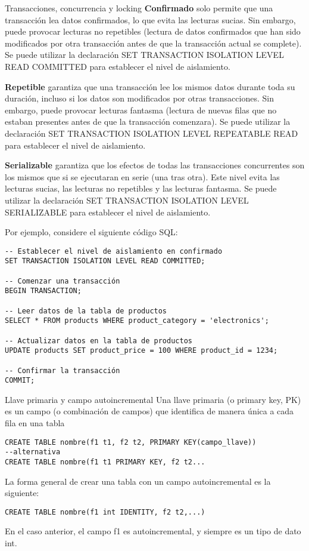 \begin{frame}[fragile]{Transacciones, concurrencia y locking}
\textbf{Confirmado} solo permite que una transacción lea datos
confirmados, lo que evita las lecturas sucias. Sin embargo, puede
provocar lecturas no repetibles (lectura de datos confirmados que han
sido modificados por otra transacción antes de que la transacción actual
se complete). Se puede utilizar la declaración SET TRANSACTION ISOLATION
LEVEL READ COMMITTED para establecer el nivel de aislamiento.

\textbf{Repetible} garantiza que una transacción lee los mismos datos
durante toda su duración, incluso si los datos son modificados por otras
transacciones. Sin embargo, puede provocar lecturas fantasma (lectura de
nuevas filas que no estaban presentes antes de que la transacción
comenzara). Se puede utilizar la declaración SET TRANSACTION ISOLATION
LEVEL REPEATABLE READ para establecer el nivel de aislamiento.

\textbf{Serializable} garantiza que los efectos de todas las
transacciones concurrentes son los mismos que si se ejecutaran en serie
(una tras otra). Este nivel evita las lecturas sucias, las lecturas no
repetibles y las lecturas fantasma. Se puede utilizar la declaración SET
TRANSACTION ISOLATION LEVEL SERIALIZABLE para establecer el nivel de
aislamiento.

Por ejemplo, considere el siguiente código SQL:

\begin{verbatim}
-- Establecer el nivel de aislamiento en confirmado
SET TRANSACTION ISOLATION LEVEL READ COMMITTED;

-- Comenzar una transacción
BEGIN TRANSACTION;

-- Leer datos de la tabla de productos
SELECT * FROM products WHERE product_category = 'electronics';

-- Actualizar datos en la tabla de productos
UPDATE products SET product_price = 100 WHERE product_id = 1234;

-- Confirmar la transacción
COMMIT;
\end{verbatim}
\end{frame}

\begin{frame}[fragile]{Llave primaria y campo autoincremental}
\protect\hypertarget{llave-primaria-y-campo-autoincremental}{}
Una llave primaria (o primary key, PK) es un campo (o combinación de
campos) que identifica de manera única a cada fila en una tabla

\begin{verbatim}
CREATE TABLE nombre(f1 t1, f2 t2, PRIMARY KEY(campo_llave))
--alternativa
CREATE TABLE nombre(f1 t1 PRIMARY KEY, f2 t2...
\end{verbatim}

La forma general de crear una tabla con un campo autoincremental es la
siguiente:

\begin{verbatim}
CREATE TABLE nombre(f1 int IDENTITY, f2 t2,...)
\end{verbatim}

En el caso anterior, el campo f1 es autoincremental, y siempre es un
tipo de dato int.
\end{frame}

